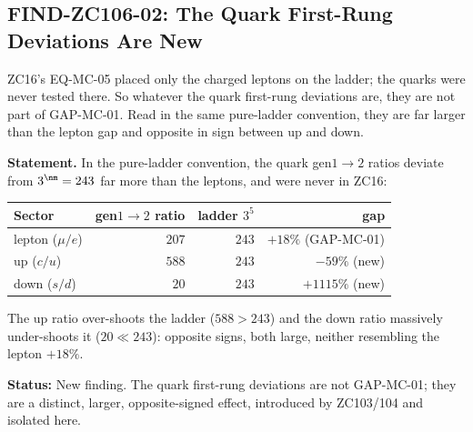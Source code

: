 \documentclass[12pt, a4paper]{article}
\begin{document}

\subsection{FIND-ZC106-02: The Quark First-Rung Deviations Are New}
\label{sec:quark-zc106}

ZC16's EQ-MC-05 placed only the charged leptons on the ladder; the quarks were
never tested there. So whatever the quark first-rung deviations are, they are not
part of GAP-MC-01. Read in the same pure-ladder convention, they are far larger
than the lepton gap and opposite in sign between up and down.

\begin{formalbox}[title={FIND-ZC106-02: the quark first-rung is large and new ($R_1$, numerical)}]

\textbf{Statement.} In the pure-ladder convention, the quark gen$1{\to}2$ ratios
deviate from $3^{\nm}=243$ far more than the leptons, and were never in ZC16:
\begin{center}
{\small\renewcommand{\arraystretch}{1.25}
\begin{tabular}{@{}lrrr@{}}
\toprule
Sector & gen$1{\to}2$ ratio & ladder $3^5$ & gap \\
\midrule
lepton ($\mu/e$) & $207$ & $243$ & $+18\%$ \quad(GAP-MC-01) \\
up ($c/u$)       & $588$ & $243$ & $-59\%$ \quad(new) \\
down ($s/d$)     & $20$  & $243$ & $+1115\%$ \quad(new) \\
\bottomrule
\end{tabular}}
\end{center}
The up ratio over-shoots the ladder ($588>243$) and the down ratio massively
under-shoots it ($20\ll243$): opposite signs, both large, neither resembling the
lepton $+18\%$.

\textbf{Status:} New finding. The quark first-rung deviations are not GAP-MC-01;
they are a distinct, larger, opposite-signed effect, introduced by ZC103/104 and
isolated here.
\end{formalbox}
\end{document}
